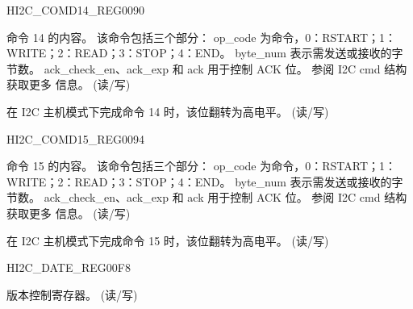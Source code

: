 \begin{register}{H}{I2C\_COMD14\_REG}{\hexprefix{}0090}\label{regdesc:I2CCOMD14REG}
%
%
%
\regnewline%
\begin{regdesc}\begin{reglist}
\label{fielddesc:I2CCOMMAND14}\item [I2C\_COMMAND14] 命令 14 的内容。 该命令包括三个部分：
op\_code 为命令，0：RSTART；1：WRITE；2：READ；3：STOP；4：END。
byte\_num 表示需发送或接收的字节数。
ack\_check\_en、ack\_exp 和 ack 用于控制 ACK 位。 参阅 I2C cmd 结构获取更多
信息。 (读/写)
\label{fielddesc:I2CCOMMAND14DONE}\item [I2C\_COMMAND14\_DONE] 在 I2C 主机模式下完成命令 14 时，该位翻转为高电平。 (读/写)
\end{reglist}\end{regdesc}
\end{register}


\begin{register}{H}{I2C\_COMD15\_REG}{\hexprefix{}0094}\label{regdesc:I2CCOMD15REG}
%
%
%
\regnewline%
\begin{regdesc}\begin{reglist}
\label{fielddesc:I2CCOMMAND15}\item [I2C\_COMMAND15] 命令 15 的内容。 该命令包括三个部分：
op\_code 为命令，0：RSTART；1：WRITE；2：READ；3：STOP；4：END。
byte\_num 表示需发送或接收的字节数。
ack\_check\_en、ack\_exp 和 ack 用于控制 ACK 位。 参阅 I2C cmd 结构获取更多
信息。 (读/写)
\label{fielddesc:I2CCOMMAND15DONE}\item [I2C\_COMMAND15\_DONE] 在 I2C 主机模式下完成命令 15 时，该位翻转为高电平。 (读/写)
\end{reglist}\end{regdesc}
\end{register}


\begin{register}{H}{I2C\_DATE\_REG}{\hexprefix{}00F8}\label{regdesc:I2CDATEREG}
%
\regnewline%
\begin{regdesc}\begin{reglist}
\label{fielddesc:I2CDATE}\item [I2C\_DATE] 版本控制寄存器。 (读/写)
\end{reglist}\end{regdesc}
\end{register}


